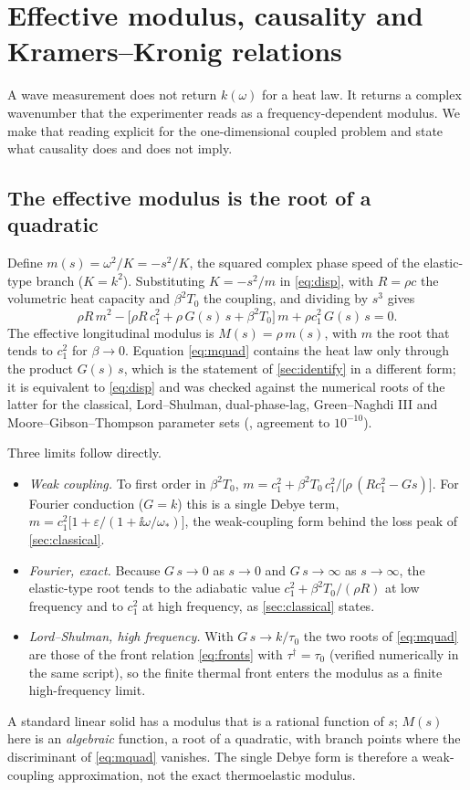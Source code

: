 \section{Effective modulus, causality and Kramers--Kronig relations}\label{sec:modulus}
A wave measurement does not return $k(\omega)$ for a heat law. It returns a complex wavenumber that the experimenter reads as a frequency-dependent modulus. We make that reading explicit for the one-dimensional coupled problem and state what causality does and does not imply.

\subsection{The effective modulus is the root of a quadratic}
Define $m(s)=\omega^2/K=-s^2/K$, the squared complex phase speed of the elastic-type branch ($K=k^2$). Substituting $K=-s^2/m$ in \eqref{eq:disp}, with $R=\rho c$ the volumetric heat capacity and $\beta^2T_0$ the coupling, and dividing by $s^3$ gives
\begin{equation}
\rho R\,m^2-\bigl[\rho R\,c_1^2+\rho\,G(s)\,s+\beta^2T_0\bigr]\,m+\rho c_1^2\,G(s)\,s=0 .\label{eq:mquad}
\end{equation}
The effective longitudinal modulus is $M(s)=\rho\,m(s)$, with $m$ the root that tends to $c_1^2$ for $\beta\to0$. Equation \eqref{eq:mquad} contains the heat law only through the product $G(s)\,s$, which is the statement of \cref{sec:identify} in a different form; it is equivalent to \eqref{eq:disp} and was checked against the numerical roots of the latter for the classical, Lord--Shulman, dual-phase-lag, Green--Naghdi III and Moore--Gibson--Thompson parameter sets (, agreement to $10^{-10}$).

Three limits follow directly.
\begin{itemize}
\item \emph{Weak coupling.} To first order in $\beta^2T_0$, $m=c_1^2+\beta^2T_0\,c_1^2\big/\bigl[\rho\,(R c_1^2-G s)\bigr]$. For Fourier conduction ($G=k$) this is a single Debye term, $m=c_1^2\bigl[1+\varepsilon/(1+\ii\omega/\omega_*)\bigr]$, the weak-coupling form behind the loss peak of \cref{sec:classical}.
\item \emph{Fourier, exact.} Because $G\,s\to0$ as $s\to0$ and $G\,s\to\infty$ as $s\to\infty$, the elastic-type root tends to the adiabatic value $c_1^2+\beta^2T_0/(\rho R)$ at low frequency and to $c_1^2$ at high frequency, as \cref{sec:classical} states.
\item \emph{Lord--Shulman, high frequency.} With $G\,s\to k/\tau_0$ the two roots of \eqref{eq:mquad} are those of the front relation \eqref{eq:fronts} with $\tau^\dagger=\tau_0$ (verified numerically in the same script), so the finite thermal front enters the modulus as a finite high-frequency limit.
\end{itemize}
A standard linear solid has a modulus that is a rational function of $s$; $M(s)$ here is an \emph{algebraic} function, a root of a quadratic, with branch points where the discriminant of \eqref{eq:mquad} vanishes. The single Debye form is therefore a weak-coupling approximation, not the exact thermoelastic modulus.


